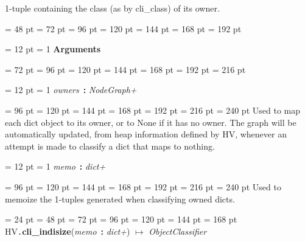 {{{{{{1-tuple containing the class (as by cli{\_}class) of its owner.
\par}
\par}
\par}
{\par \noindent  \leftskip = 48 pt  \leftmargini = 72 pt  \leftmarginii = 96 pt  \leftmarginiii = 120 pt  \leftmarginiv = 144 pt  \leftmarginv = 168 pt  \leftmarginvi = 192 pt {\par \noindent
{\par \pagebreak[3.100000] \noindent \hangindent = 12 pt \hangafter = 1 
{\bf Arguments\/}\par}
{\par \noindent  \leftskip = 72 pt  \leftmargini = 96 pt  \leftmarginii = 120 pt  \leftmarginiii = 144 pt  \leftmarginiv = 168 pt  \leftmarginv = 192 pt  \leftmarginvi = 216 pt {\par \noindent
{\par \pagebreak[3.000000] \noindent \hangindent = 12 pt \hangafter = 1 
{\em owners\/}~{\bf :}  {\em NodeGraph+\/}\par}
{\par \noindent  \leftskip = 96 pt  \leftmargini = 120 pt  \leftmarginii = 144 pt  \leftmarginiii = 168 pt  \leftmarginiv = 192 pt  \leftmarginv = 216 pt  \leftmarginvi = 240 pt 
Used to map each dict object to its owner, or to None if it has no
owner. The graph will be automatically updated, from heap information
defined by HV, whenever an attempt is made to classify a dict that
maps to nothing.\par}
{\par \pagebreak[3.000000] \noindent \hangindent = 12 pt \hangafter = 1 
{\em memo\/}~{\bf :}  {\em dict+\/}\par}
{\par \noindent  \leftskip = 96 pt  \leftmargini = 120 pt  \leftmarginii = 144 pt  \leftmarginiii = 168 pt  \leftmarginiv = 192 pt  \leftmarginv = 216 pt  \leftmarginvi = 240 pt  Used to memoize the 1-tuples  generated when classifying owned dicts.
\par}
\par}
\par}
\par}
\par}
\par}
\par}
{\par \noindent  \leftskip = 24 pt  \leftmargini = 48 pt  \leftmarginii = 72 pt  \leftmarginiii = 96 pt  \leftmarginiv = 120 pt  \leftmarginv = 144 pt  \leftmarginvi = 168 pt HV{\tt .\/}{\bf {\large {\bf cli{\_}indisize\/}}\/}({\em memo\/}~{\bf :}  {\em dict+\/}) \(\mapsto \)  {\em ObjectClassifier\/}{\par \noindent
}}}
